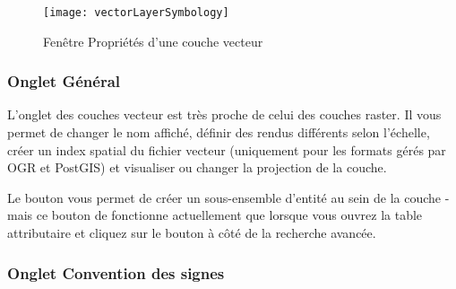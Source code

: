 \begin{figure}[H]
  \begin{center}
  \caption{Fenêtre Propriétés d'une couche vecteur \nixcaption}\label{fig:vector_symbology}\smallskip
  \texttt{[image: vectorLayerSymbology]}
\end{center}
\end{figure}

\subsubsection{Onglet Général}\label{vectorgeneraltab}
L'onglet  des couches vecteur est très proche de celui des couches raster. Il vous permet de changer le nom affiché, définir des rendus différents selon l'échelle, créer un index spatial du fichier vecteur (uniquement pour les formats gérés par OGR et PostGIS) et visualiser ou changer la projection de la couche.

Le bouton  vous permet de créer un sous-ensemble d'entité au sein de la couche - mais ce bouton de fonctionne actuellement que lorsque vous ouvrez la table attributaire et cliquez sur le bouton  à côté de la recherche avancée.

\subsubsection{Onglet Convention des signes}\label{sec:symbology}

